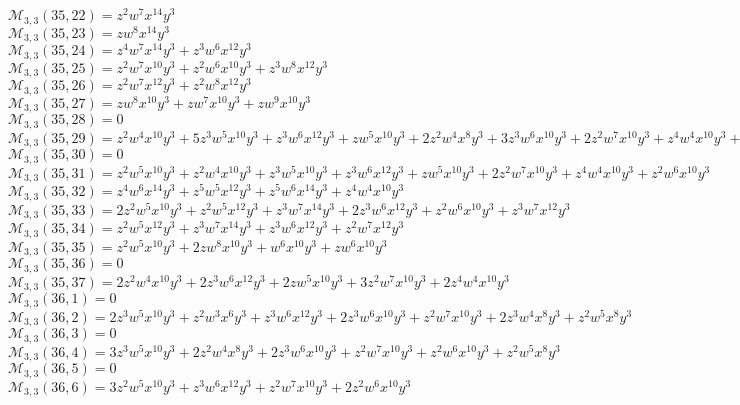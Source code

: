 $\mathcal{M}_{3,3}(35,22)=z^2w^7x^{14}y^3$\\
$\mathcal{M}_{3,3}(35,23)=zw^8x^{14}y^3$\\
$\mathcal{M}_{3,3}(35,24)=z^4w^7x^{14}y^3+z^3w^6x^{12}y^3$\\
$\mathcal{M}_{3,3}(35,25)=z^2w^7x^{10}y^3+z^2w^6x^{10}y^3+z^3w^8x^{12}y^3$\\
$\mathcal{M}_{3,3}(35,26)=z^2w^7x^{12}y^3+z^2w^8x^{12}y^3$\\
$\mathcal{M}_{3,3}(35,27)=zw^8x^{10}y^3+zw^7x^{10}y^3+zw^9x^{10}y^3$\\
$\mathcal{M}_{3,3}(35,28)=0$\\
$\mathcal{M}_{3,3}(35,29)=z^2w^4x^{10}y^3+5z^3w^5x^{10}y^3+z^3w^6x^{12}y^3+zw^5x^{10}y^3+2z^2w^4x^8y^3+3z^3w^6x^{10}y^3+2z^2w^7x^{10}y^3+z^4w^4x^{10}y^3+z^2w^5x^8y^3$\\
$\mathcal{M}_{3,3}(35,30)=0$\\
$\mathcal{M}_{3,3}(35,31)=z^2w^5x^{10}y^3+z^2w^4x^{10}y^3+z^3w^5x^{10}y^3+z^3w^6x^{12}y^3+zw^5x^{10}y^3+2z^2w^7x^{10}y^3+z^4w^4x^{10}y^3+z^2w^6x^{10}y^3$\\
$\mathcal{M}_{3,3}(35,32)=z^4w^6x^{14}y^3+z^5w^5x^{12}y^3+z^5w^6x^{14}y^3+z^4w^4x^{10}y^3$\\
$\mathcal{M}_{3,3}(35,33)=2z^2w^5x^{10}y^3+z^2w^5x^{12}y^3+z^3w^7x^{14}y^3+2z^3w^6x^{12}y^3+z^2w^6x^{10}y^3+z^3w^7x^{12}y^3$\\
$\mathcal{M}_{3,3}(35,34)=z^2w^5x^{12}y^3+z^3w^7x^{14}y^3+z^3w^6x^{12}y^3+z^2w^7x^{12}y^3$\\
$\mathcal{M}_{3,3}(35,35)=z^2w^5x^{10}y^3+2zw^8x^{10}y^3+w^6x^{10}y^3+zw^6x^{10}y^3$\\
$\mathcal{M}_{3,3}(35,36)=0$\\
$\mathcal{M}_{3,3}(35,37)=2z^2w^4x^{10}y^3+2z^3w^6x^{12}y^3+2zw^5x^{10}y^3+3z^2w^7x^{10}y^3+2z^4w^4x^{10}y^3$\\
$\mathcal{M}_{3,3}(36,1)=0$\\
$\mathcal{M}_{3,3}(36,2)=2z^3w^5x^{10}y^3+z^2w^3x^6y^3+z^3w^6x^{12}y^3+2z^3w^6x^{10}y^3+z^2w^7x^{10}y^3+2z^3w^4x^8y^3+z^2w^5x^8y^3$\\
$\mathcal{M}_{3,3}(36,3)=0$\\
$\mathcal{M}_{3,3}(36,4)=3z^3w^5x^{10}y^3+2z^2w^4x^8y^3+2z^3w^6x^{10}y^3+z^2w^7x^{10}y^3+z^2w^6x^{10}y^3+z^2w^5x^8y^3$\\
$\mathcal{M}_{3,3}(36,5)=0$\\
$\mathcal{M}_{3,3}(36,6)=3z^2w^5x^{10}y^3+z^3w^6x^{12}y^3+z^2w^7x^{10}y^3+2z^2w^6x^{10}y^3$\\
